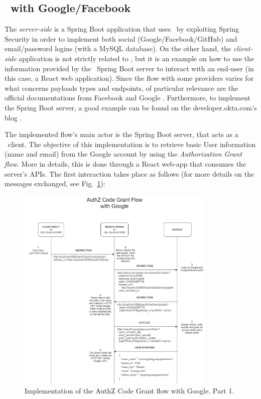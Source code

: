 \subsection{\oauth\ with Google/Facebook}
The \textit{server-side} is a Spring Boot application that uses \oauth\ by exploiting Spring Security in order to implement both social (Google/Facebook/GitHub) and email/password logins (with a MySQL database). On the other hand, the \textit{client-side} application is not strictly related to \oauth, but it is an example on how to use the information provided by the \oauth\ Spring Boot server to interact with an end-user (in this case, a React web application). Since the flow with some providers varies for what concerns payloads types and endpoints, of particular relevance are the official documentations from Facebook \cite{facebook} and Google \cite{google1, google2}. Furthermore, to implement the Spring Boot server, a good example can be found on the developer.okta.com's blog \cite{sprboot}. 

The implemented flow's main actor is the Spring Boot server, that acts as a \oauth\ client. The objective of this implementation is to retrieve basic User information (name and email) from the Google account by using the \textit{Authorization Grant flow}. More in details, this is done through a React web-app that consumes the server's APIs. The first interaction takes place as follows (for more details on the messages exchanged, see Fig.~\ref{fig:google1}):

\begin{figure}[h]
    \centering
    \includegraphics[width=0.85\textwidth]{chapters/images/chp6/flow_google1.png}
    \caption{Implementation of the AuthZ Code Grant flow with Google. Part 1.}
    \label{fig:google1}
\end{figure}

